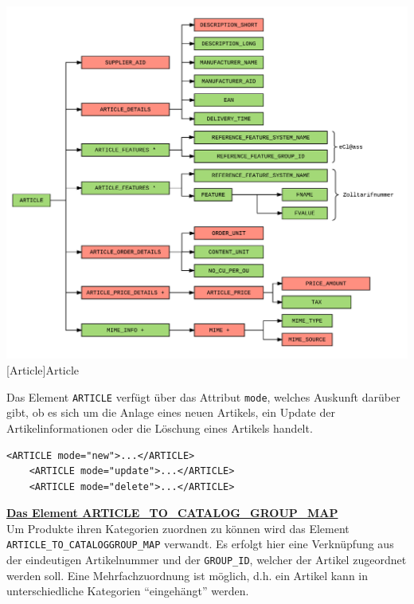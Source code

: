 	\begin{minipage}{\linewidth}
		\vspace{1em}
		\centering
		\includegraphics[width=1\linewidth]{img/Article}
		[Article]{Article}
		\label{fig:header}
		\vspace{1em}
	\end{minipage}
	
	Das Element \texttt{ARTICLE} verfügt über das Attribut \texttt{mode}, welches Auskunft darüber gibt, ob es sich um die Anlage eines neuen Artikels, ein Update der Artikelinformationen oder die Löschung eines Artikels handelt.
	
	\begin{lstlisting}[caption={Die verschiedenen Artikelmodi}] 
	<ARTICLE mode="new">...</ARTICLE>
	<ARTICLE mode="update">...</ARTICLE>
	<ARTICLE mode="delete">...</ARTICLE>
	\end{lstlisting}
	\pagebreak
	
	
	\textbf{\underline{Das Element ARTICLE\_TO\_CATALOG\_GROUP\_MAP}}\\
	
	Um Produkte ihren Kategorien zuordnen zu können wird das Element \texttt{ARTICLE\_TO\_CATALOGGROUP\_MAP} verwandt. Es erfolgt hier eine Verknüpfung aus der eindeutigen Artikelnummer und der \texttt{GROUP\_ID}, welcher der Artikel zugeordnet werden soll. Eine Mehrfachzuordnung ist möglich, d.h. ein Artikel kann in unterschiedliche Kategorien \enquote{eingehängt} werden.
	
